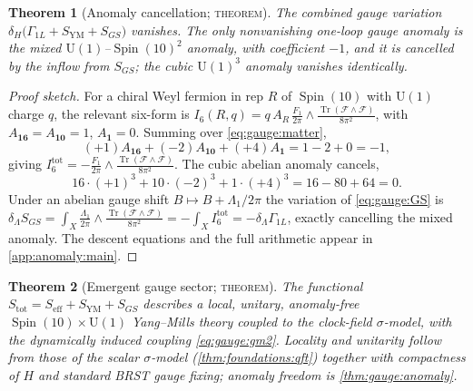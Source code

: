 \documentclass[11pt]{article}
\theoremstyle{plain}
\newtheorem{theorem}{Theorem}[section]
\theoremstyle{definition}
\theoremstyle{remark}
\newcommand{\U}[1]{\mathrm{U}(#1)}
\newcommand{\Spin}{\operatorname{Spin}}
\newcommand{\Tr}{\operatorname{Tr}}
\newcommand{\Uone}{\U{1}}
\begin{document}
\begin{theorem}[Anomaly cancellation; \textsc{theorem}]\label{thm:gauge:anomaly}
\label{sec:anomaly:main}
The combined gauge variation
$\delta_H\bigl(\Gamma_{1L}+S_{\text{YM}}+S_{GS}\bigr)$ vanishes. The only
nonvanishing one-loop gauge anomaly is the mixed $\Uone$--$\Spin(10)^{2}$
anomaly, with coefficient $-1$, and it is cancelled by the inflow from
$S_{GS}$; the cubic $\Uone^{3}$ anomaly vanishes identically.
\end{theorem}

\begin{proof}[Proof sketch]
For a chiral Weyl fermion in rep $R$ of $\Spin(10)$ with $\Uone$ charge
$q$, the relevant six-form is
$I_6(R,q)=q\,A_R\,\frac{F_1}{2\pi}\wedge\frac{\Tr(\mathcal F\wedge\mathcal F)}{8\pi^2}$,
with $A_{\mathbf{16}}=A_{\mathbf{10}}=1$, $A_{\mathbf 1}=0$. Summing over
\eqref{eq:gauge:matter},
\begin{equation}\label{eq:gauge:mixed}
  (+1)A_{\mathbf{16}}+(-2)A_{\mathbf{10}}+(+4)A_{\mathbf 1}
  = 1-2+0 = -1,
\end{equation}
giving $I_6^{\text{tot}}=-\frac{F_1}{2\pi}\wedge\frac{\Tr(\mathcal F\wedge\mathcal F)}{8\pi^2}$.
The cubic abelian anomaly cancels,
\begin{equation}\label{eq:gauge:cubic}
  16\cdot(+1)^{3}+10\cdot(-2)^{3}+1\cdot(+4)^{3}
  = 16 - 80 + 64 = 0.
\end{equation}
Under an abelian gauge shift $B\mapsto B+\Lambda_1/2\pi$ the variation of
\eqref{eq:gauge:GS} is
$\delta_\Lambda S_{GS}=\int_X\frac{\Lambda_1}{2\pi}\wedge\frac{\Tr(\mathcal F\wedge\mathcal F)}{8\pi^2}=-\int_X I_6^{\text{tot}}=-\delta_\Lambda\Gamma_{1L}$,
exactly cancelling the mixed anomaly. The descent equations and the full
arithmetic appear in \autoref{app:anomaly:main}.
\end{proof}

\begin{theorem}[Emergent gauge sector; \textsc{theorem}]\label{thm:gauge:sector}
\label{thm:foundations:qft}
The functional $S_{\text{tot}}=S_{\text{eff}}+S_{\text{YM}}+S_{GS}$
describes a local, unitary, anomaly-free $\Spin(10)\times\Uone$
Yang--Mills theory coupled to the clock-field $\sigma$-model, with the
dynamically induced coupling \eqref{eq:gauge:gm2}. Locality and unitarity
follow from those of the scalar $\sigma$-model (\autoref{thm:foundations:qft})
together with compactness of $H$ and standard BRST gauge fixing; anomaly
freedom is \autoref{thm:gauge:anomaly}.
\end{theorem}
\end{document}
